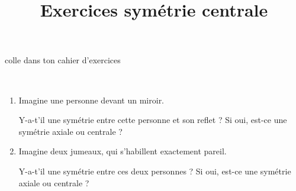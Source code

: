 \documentclass[a4paper,12pt]{article}
\title{Exercices symétrie centrale}
\date{}
\author{}
\makeatletter
\renewcommand{\maketitle}{%
{\tiny colle dans ton cahier d'exercices}
	\begin{center}
		\LARGE
		\myuline{\@title}
		\vspace{1em}
	\end{center}
}
\makeatother
\begin{document}
\maketitle

\begin{exercice}\ \\
	\begin{enumerate}
		\item Imagine une personne devant un miroir.

		      Y-a-t'il une symétrie entre cette personne et son reflet ? Si oui, est-ce une symétrie axiale ou centrale ? \vspace{4em}
		\item Imagine deux jumeaux, qui s'habillent exactement pareil.

		      Y-a-t'il une symétrie entre ces deux personnes ? Si oui, est-ce une symétrie axiale ou centrale ? \vspace{4em}
	\end{enumerate}
\end{exercice}
\end{document}
